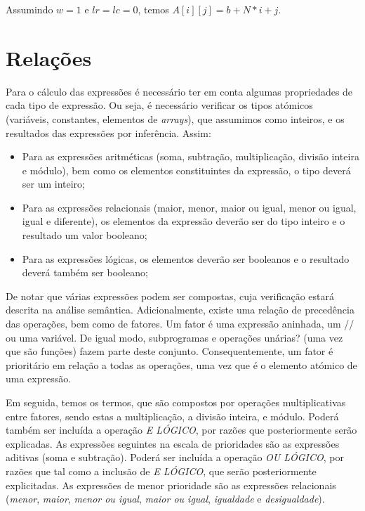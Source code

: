 Assumindo $w = 1$ e $lr = lc = 0$, temos $A[i][j] = b + N*i + j$.

\section{Relações}
\label{sec:relacoes:analise}

Para o cálculo das expressões é necessário ter em conta algumas propriedades de
cada tipo de expressão. Ou seja, é necessário verificar os tipos atómicos
(variáveis, constantes, elementos de \emph{arrays}), que assumimos como
inteiros, e os resultados das expressões por inferência. Assim:
\begin{itemize}
\item Para as expressões aritméticas (soma, subtração, multiplicação, divisão
	inteira e módulo), bem como os elementos constituintes da expressão, o tipo
	deverá ser um inteiro;
\item Para as expressões relacionais (maior, menor, maior ou igual, menor ou
	igual, igual e diferente), os elementos da expressão deverão ser do tipo
	inteiro e o resultado um valor booleano;
\item Para as expressões lógicas, os elementos deverão ser booleanos
	e o resultado deverá também ser booleano;
\end{itemize}

De notar que várias expressões podem ser compostas, cuja verificação estará
descrita na análise semântica. Adicionalmente, existe uma relação de precedência
das operações, bem como de fatores. Um fator é uma expressão aninhada, um // ou
uma variável. De igual modo, subprogramas e operações unárias? (uma vez que são
funções) fazem parte deste conjunto. Consequentemente, um fator é prioritário
em relação a todas as operações, uma vez que é o elemento atómico de uma
expressão.

Em seguida, temos os termos, que são compostos por operações multiplicativas
entre fatores, sendo estas a multiplicação, a divisão inteira, e módulo. Poderá
também ser incluída a operação \emph{E LÓGICO}, por razões que
posteriormente serão explicadas. As expressões seguintes na escala de
prioridades são as expressões aditivas (soma e subtração). Poderá ser incluída
a operação \emph{OU LÓGICO}, por razões que tal como a inclusão de
\emph{E LÓGICO}, que serão posteriormente explicitadas. As expressões de menor
prioridade são as expressões relacionais (\emph{menor}, \emph{maior},
\emph{menor ou igual}, \emph{maior ou igual}, \emph{igualdade}
e \emph{desigualdade}).

